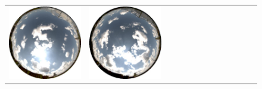\documentclass{report}
\begin{document}
\begin{figure}[!th]
\begin{tabular}{@{}rcccccccccccc@{}}
    \includegraphics[width=\customwidth]{./figures/database/20130824_130014.jpg} &
    \includegraphics[width=\customwidth]{./figures/database/20130824_133006.jpg} &

\end{tabular}
\end{figure}
\end{document}
